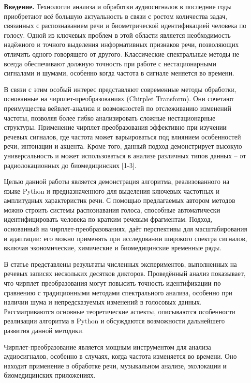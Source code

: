 \begin{multicols}{2}
{\bfseries Введение.} Технологии анализа и обработки аудиосигналов в
последние годы приобретают всё большую актуальность в связи с ростом
количества задач, связанных с распознаванием речи и биометрической
идентификацией человека по голосу. Одной из ключевых проблем в этой
области является необходимость надёжного и точного выделения
информативных признаков речи, позволяющих отличить одного говорящего от
другого. Классические спектральные методы не всегда обеспечивают должную
точность при работе с нестационарными сигналами и шумами, особенно когда
частота в сигнале меняется во времени.

В связи с этим особый интерес представляют современные методы обработки,
основанные на чирплет-преобразованиях (Chirplet Transform). Они сочетают
преимущества вейвлет-анализа и возможностей по отслеживанию изменений
частоты, позволяя более гибко анализировать сложные нестационарные
структуры. Применение чирплет-преобразования эффективно при изучении
речевых сигналов, где частота может варьироваться под влиянием
особенностей речи, интонации и акцента. Кроме того, данный подход
демонстрирует высокую универсальность и может использоваться в анализе
различных типов данных -- от радиолокационных до биомедицинских
{[}1-3{]}.

Целью данной работы является демонстрация алгоритма, реализованного на
языке Python и предназначенного для выделения ключевых частотных и
амплитудных характеристик речи. С помощью предлагаемых автором методов
можно строить системы распознавания голоса, способные автоматически
идентифицировать человека по кратким речевым фрагментам. Подход,
основанный на чирплет-преобразованиях, даёт перспективы для
масштабирования и адаптации: его можно применять при исследовании
широкого спектра сигналов, включая экономические, химические и
биомедицинские временные ряды.

В статье представлены результаты численных экспериментов, выполненных на
речевых записях нескольких десятков дикторов. Проведённый анализ
показывает, что чирплет-преобразования могут повысить точность
идентификации по сравнению с традиционными методами спектрального
анализа, особенно при наличии шума и непредсказуемых изменений в
голосовых данных. Рассматриваются основные теоретические аспекты,
описываются особенности реализации алгоритма в Python и обсуждаются
возможности дальнейшего развития данной методики.

Чирплет-преобразование является мощным инструментом для анализа
аудиосигналов, особенно в случаях, когда частота изменяется во времени.
Оно находит применение в обработке речи, музыкальном анализе, эхолокации
и биомедицинских приложениях.


\end{multicols}
